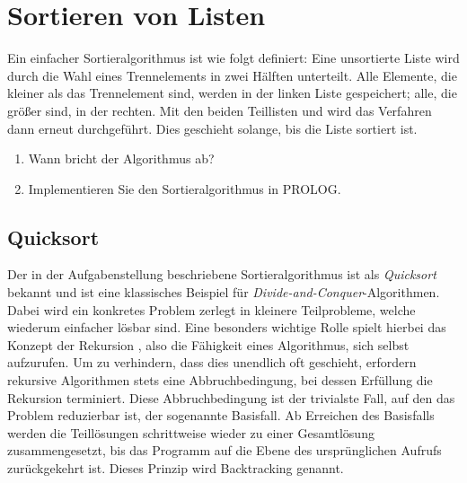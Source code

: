 \chapter{Sortieren von Listen}
\label{ch:01_sorting-lists}

\begin{universityTask}
    Ein einfacher Sortieralgorithmus ist wie folgt definiert:  
    Eine unsortierte Liste wird durch die Wahl eines Trennelements in zwei Hälften unterteilt. Alle Elemente, die kleiner als das Trennelement sind, werden in der linken Liste gespeichert; alle, die größer sind, in der rechten. Mit den beiden Teillisten  und  wird das Verfahren dann erneut durchgeführt. Dies geschieht solange, bis die Liste sortiert ist.

    \begin{enumerate}[label=(\arabic*)]
        \item Wann bricht der Algorithmus ab?
        \item Implementieren Sie den Sortieralgorithmus in PROLOG.
    \end{enumerate}
    
\end{universityTask}

\section{Quicksort}
\label{sec:01-01_quicksort}

Der in der Aufgabenstellung beschriebene Sortieralgorithmus ist als \textit{Quicksort} bekannt und ist eine klassisches Beispiel für \textit{Divide-and-Conquer}-Algorithmen. Dabei wird ein konkretes Problem zerlegt in kleinere Teilprobleme, welche wiederum einfacher lösbar sind. Eine besonders wichtige Rolle spielt hierbei das Konzept der Rekursion \cite[S. 49 ff.]{003_KII11_basics-of-artificial-intelligence}, also die Fähigkeit eines Algorithmus, sich selbst aufzurufen. Um zu verhindern, dass dies unendlich oft geschieht, erfordern rekursive Algorithmen stets eine Abbruchbedingung, bei dessen Erfüllung die Rekursion terminiert. Diese Abbruchbedingung ist der trivialste Fall, auf den das Problem reduzierbar ist, der sogenannte Basisfall. Ab Erreichen des Basisfalls werden die Teillösungen schrittweise wieder zu einer Gesamtlösung zusammengesetzt, bis das Programm auf die Ebene des ursprünglichen Aufrufs zurückgekehrt ist. Dieses Prinzip wird Backtracking \cite[S. 43]{003_KII11_basics-of-artificial-intelligence} genannt.

